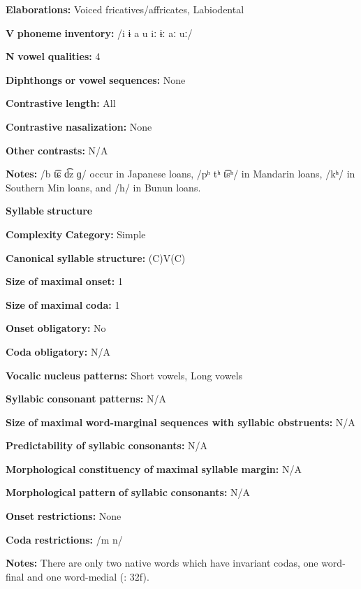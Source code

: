 \begin{styleBody}
\textbf{Elaborations:} Voiced fricatives/affricates, Labiodental

\textbf{V} \textbf{phoneme} \textbf{inventory:} /i ɨ a u iː ɨː aː uː/

\textbf{N} \textbf{vowel} \textbf{qualities:} 4

\textbf{Diphthongs} \textbf{or} \textbf{vowel} \textbf{sequences:} None

\textbf{Contrastive} \textbf{length:} All

\textbf{Contrastive} \textbf{nasalization:} None

\textbf{Other} \textbf{contrasts:} N/A

\textbf{Notes:} /b t͡ɕ d͡z ɡ/ occur in Japanese loans, /pʰ tʰ t͡sʰ/ in Mandarin loans, /kʰ/ in Southern Min loans, and /h/ in Bunun loans.

\textbf{Syllable} \textbf{structure}

\textbf{Complexity} \textbf{Category:} Simple

\textbf{Canonical} \textbf{syllable} \textbf{structure:} (C)V(C) \citep[32-33]{Pan2012}

\textbf{Size} \textbf{of} \textbf{maximal} \textbf{onset:} 1

\textbf{Size} \textbf{of} \textbf{maximal} \textbf{coda:} 1

\textbf{Onset} \textbf{obligatory:} No

\textbf{Coda} \textbf{obligatory:} N/A

\textbf{Vocalic} \textbf{nucleus} \textbf{patterns:} Short vowels, Long vowels

\textbf{Syllabic} \textbf{consonant} \textbf{patterns:} N/A

\textbf{Size} \textbf{of} \textbf{maximal} \textbf{word{}-marginal sequences with syllabic obstruents:} N/A

\textbf{Predictability} \textbf{of} \textbf{syllabic} \textbf{consonants:} N/A

\textbf{Morphological} \textbf{constituency} \textbf{of} \textbf{maximal} \textbf{syllable} \textbf{margin:} N/A

\textbf{Morphological} \textbf{pattern} \textbf{of} \textbf{syllabic} \textbf{consonants:} N/A

\textbf{Onset} \textbf{restrictions:} None

\textbf{Coda} \textbf{restrictions:} /m n/

\textbf{Notes:} There are only two native words which have invariant codas, one word-final and one word-medial (\citealt{Pan2012}: 32f).


\end{styleBody}
